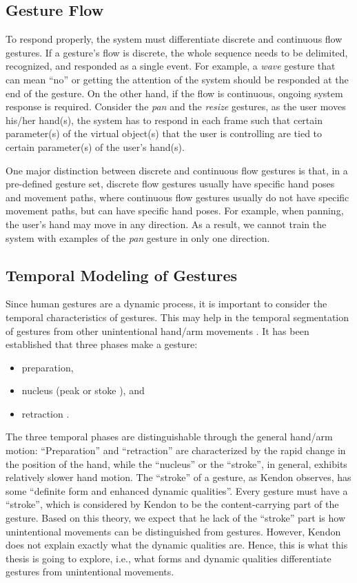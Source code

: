 \subsection{Gesture Flow}
To respond properly, the system must differentiate discrete and continuous
flow gestures. If a gesture's flow
is discrete, the whole sequence needs to be delimited, recognized, and responded
as a single event. For example, a \textit{wave} gesture that can mean ``no'' or getting the attention of the 
system should be responded at the end of the gesture. On the other hand, if the 
flow is continuous, ongoing system response is required. Consider the \textit{pan} and the \textit{resize} gestures, 
as the user moves his/her hand(s), the system has to respond in each frame such that
certain parameter(s) of the virtual object(s) that the user is controlling are tied to
certain parameter(s) of the user's hand(s).

One major distinction between discrete and continuous flow gestures is that,
in a pre-defined gesture set, discrete flow gestures usually have specific hand
poses and movement paths, where continuous flow gestures usually do not have
specific movement paths, but can have specific hand poses.
For example, when panning, the user's hand may move in any
direction. As a result, 
 we cannot train the system with examples of  the
\textit{pan} gesture in only one direction.

\subsection{Temporal Modeling of Gestures}
Since human gestures are a dynamic process, it is important to consider the
temporal characteristics of gestures. This may help in the temporal segmentation
of gestures from other unintentional hand/arm movements \cite{Pavlovic97}. It
has been established that three phases make a gesture:
\begin{itemize}
  \item preparation,
  \item nucleus (peak or stoke \cite{mcneill82}), and
  \item retraction \cite{Pavlovic97}.
\end{itemize}
The three temporal phases are distinguishable through the general hand/arm
motion: ``Preparation'' and ``retraction'' are characterized by the rapid change
in the position of the hand, while the ``nucleus'' or the ``stroke'', in
general, exhibits relatively slower hand motion. The ``stroke'' of a gesture, as
Kendon \cite{kendon86} observes, has some ``definite form and enhanced dynamic
qualities''. Every gesture must have a ``stroke'', which is considered by Kendon
to be the content-carrying part of the gesture. Based on this theory, we
expect that he lack of the ``stroke'' part is how unintentional movements can
be distinguished from gestures. However, Kendon does not explain exactly what
the dynamic qualities are. Hence, this is what this thesis is going to explore, i.e., what forms and dynamic qualities differentiate gestures from unintentional movements.

